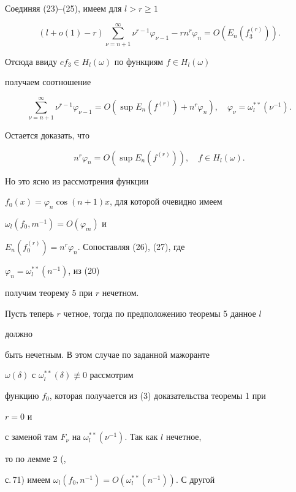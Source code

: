 Соединяя (23)--(25), имеем для $l>r\ge 1$


$$


(l+o(1)-r)\sum^\infty_{\nu=n+1}\nu^{r-1}\varphi_{\nu-1}


-rn^r\varphi_n=O(E_n(f^{(r)}_3)).


$$


Отсюда ввиду $cf_3\in H_l(\omega)$ по функциям $f\in H_l(\omega)$


получаем соотношение


\begin{equation}


\sum^\infty_{\nu=n+1}\nu^{r-1}\varphi_{\nu-1}=O(\sup E_n(f^{(r)})+


n^r\varphi_n),\quad \varphi_\nu=\omega^{**}_l(\nu^{-1}).


\end{equation}


Остается доказать, что


\begin{equation}


n^r\varphi_n=O(\sup E_n(f^{(r)})),\quad f\in H_l(\omega).


\end{equation}


Но это ясно из рассмотрения функции


$f_0(x)=\varphi_n\cos(n+1)x$, для которой очевидно имеем


$\omega_l(f_0,m^{-1})=O(\varphi_m)$ и


$E_n(f^{(r)}_0)=n^r\varphi_n$. Сопоставляя (26), (27), где


$\varphi_n=\omega^{**}_l(n^{-1})$, из (20)


получим теорему 5 при $r$ нечетном.





Пусть теперь $r$ четное, тогда по предположению теоремы 5 данное $l$


должно


быть нечетным. В этом случае по заданной мажоранте


$\omega(\delta)$ с $\omega^{**}_l(\delta)\not\equiv 0$ рассмотрим


функцию $f_0$, которая получается из (3) доказательства теоремы 1 при


$r=0$ и


с заменой там $F_\nu$ на $\omega^{**}_l(\nu^{-1})$. Так как $l$ нечетное,


то по лемме 2 (\cite{Ge1},


с.\,71) имеем $\omega_l(f_0,n^{-1})=O(\omega^{**}_l(n^{-1}))$. С другой


